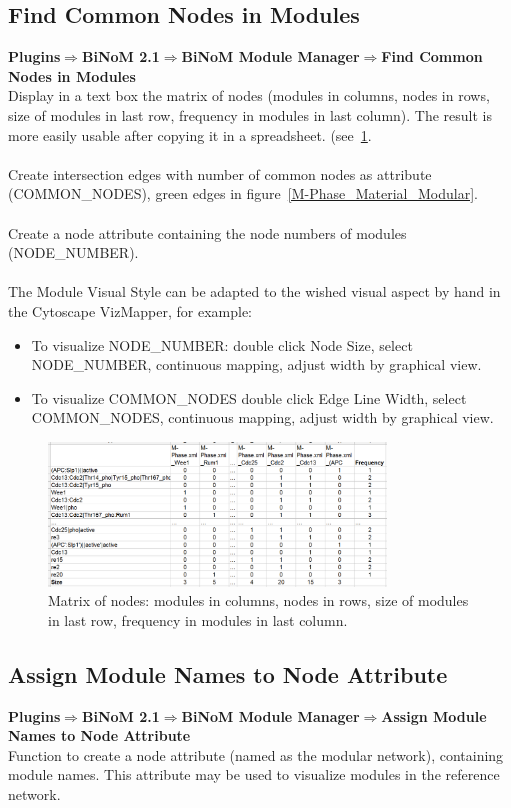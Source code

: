 \subsection{Find Common Nodes in Modules}
\textbf{Plugins$\Rightarrow$BiNoM 2.1$\Rightarrow$BiNoM Module Manager$\Rightarrow$Find Common Nodes in Modules}\\
Display in a text box the matrix of nodes (modules in columns, nodes in
rows, size of modules in last row, frequency in modules in last column). The result
is more easily usable after copying it in a spreadsheet.
(see~\ref{Common_nodes_in_modules}.\\\\
Create intersection edges with number of common nodes as attribute
(COMMON\_NODES), green edges in figure~\ref{M-Phase_Material_Modular}.\\\\
Create a node attribute containing the node numbers of modules (NODE\_NUMBER).\\\\
The Module Visual Style can be adapted to the wished visual aspect by hand in
the Cytoscape VizMapper, for example:

\begin{itemize}
\item To visualize NODE\_NUMBER: double click Node Size, select NODE\_NUMBER, continuous mapping, adjust width by graphical view.
\item To visualize COMMON\_NODES double click Edge Line Width, select COMMON\_NODES, continuous mapping, adjust width by graphical view.
\end{itemize}
\begin{figure}
\centering
\includegraphics[width=0.8\textwidth]{graphics/Common_nodes_in_modules}
\caption{Matrix of nodes: modules in columns, nodes in rows, size of modules in last row, frequency in modules in last column.}
\label{Common_nodes_in_modules}
\end{figure}

\subsection{Assign Module Names to Node Attribute}
\textbf{Plugins$\Rightarrow$BiNoM 2.1$\Rightarrow$BiNoM Module Manager$\Rightarrow$Assign Module Names to Node Attribute}\\
Function to create a node attribute (named as the modular network), containing module names. This attribute may be used to visualize modules in the reference network.

